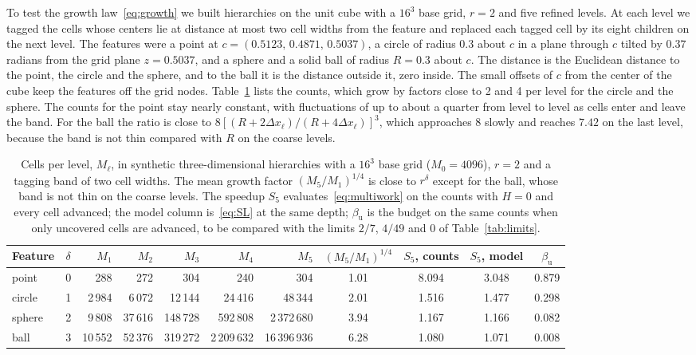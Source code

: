 \documentclass[12pt]{article}
\theoremstyle{remark}
\begin{document}
To test the growth law~\eqref{eq:growth} we built hierarchies on the unit cube with a $16^3$ base grid, $r=2$ and five refined levels. At each level we tagged the cells whose centers lie at distance at most two cell widths from the feature and replaced each tagged cell by its eight children on the next level. The features were a point at $c=(0.5123,\,0.4871,\,0.5037)$, a circle of radius $0.3$ about $c$ in a plane through $c$ tilted by $0.37$ radians from the grid plane $z=0.5037$, and a sphere and a solid ball of radius $R=0.3$ about $c$. The distance is the Euclidean distance to the point, the circle and the sphere, and to the ball it is the distance outside it, zero inside. The small offsets of $c$ from the center of the cube keep the features off the grid nodes. Table~\ref{tab:counts} lists the counts, which grow by factors close to 2 and 4 per level for the circle and the sphere. The counts for the point stay nearly constant, with fluctuations of up to about a quarter from level to level as cells enter and leave the band. For the ball the ratio is close to $8[(R+2\Delta x_\ell)/(R+4\Delta x_\ell)]^3$, which approaches 8 slowly and reaches $7.42$ on the last level, because the band is not thin compared with $R$ on the coarse levels.

\begin{table}[ht]
\centering
\small
\setlength{\tabcolsep}{4pt}
\caption{Cells per level, $M_\ell$, in synthetic three-dimensional hierarchies with a $16^3$ base grid ($M_0=4096$), $r=2$ and a tagging band of two cell widths. The mean growth factor $(M_5/M_1)^{1/4}$ is close to $r^\delta$ except for the ball, whose band is not thin on the coarse levels. The speedup $S_5$ evaluates~\eqref{eq:multiwork} on the counts with $H=0$ and every cell advanced; the model column is~\eqref{eq:SL} at the same depth; $\beta_{\mathrm{u}}$ is the budget on the same counts when only uncovered cells are advanced, to be compared with the limits $2/7$, $4/49$ and $0$ of Table~\ref{tab:limits}.}
\label{tab:counts}
\begin{tabular}{lcrrrrrcccc}
\toprule
Feature & $\delta$ & $M_1$ & $M_2$ & $M_3$ & $M_4$ & $M_5$ & $(M_5/M_1)^{1/4}$ & $S_5$, counts & $S_5$, model & $\beta_{\mathrm{u}}$\\
\midrule
point  & 0 & 288 & 272 & 304 & 240 & 304 & 1.01 & 8.094 & 3.048 & 0.879\\
circle & 1 & 2\,984 & 6\,072 & 12\,144 & 24\,416 & 48\,344 & 2.01 & 1.516 & 1.477 & 0.298\\
sphere & 2 & 9\,808 & 37\,616 & 148\,728 & 592\,808 & 2\,372\,680 & 3.94 & 1.167 & 1.166 & 0.082\\
ball   & 3 & 10\,552 & 52\,376 & 319\,272 & 2\,209\,632 & 16\,396\,936 & 6.28 & 1.080 & 1.071 & 0.008\\
\bottomrule
\end{tabular}
\end{table}
\end{document}
